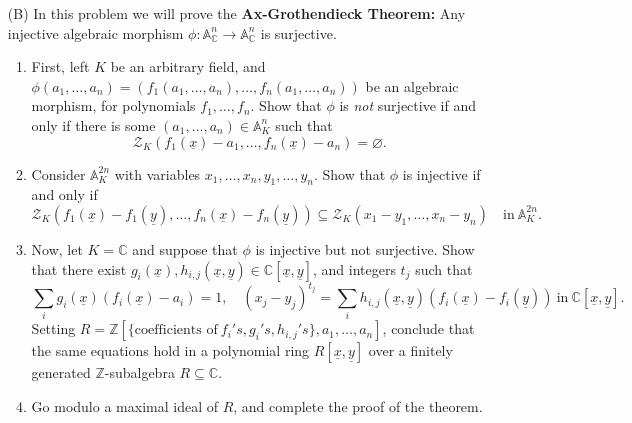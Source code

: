 \documentclass{amsart}[12pt]
\newcommand{\A}{\mathbb{A}}
\newcommand{\C}{\mathbb{C}}
\numberwithin{equation}{section}
\theoremstyle{plain} %
\theoremstyle{definition}
\theoremstyle{remark}
\begin{document}
\begin{enumerate}
\item[(B)] In this problem we will prove the \textbf{Ax-Grothendieck Theorem:} Any injective algebraic morphism $\phi: \A^n_{\C} \to \A^n_{\C}$ is surjective.
\begin{enumerate} \item First, left $K$ be an arbitrary field, and $\phi(a_1,\dots,a_n) = (f_1(a_1,\dots,a_n),\dots, f_n(a_1,\dots,a_n))$ be an algebraic morphism, for polynomials $f_1,\dots,f_n$. Show that $\phi$ is \emph{not} surjective if and only if there is some $(a_1,\dots,a_n)\in \A^n_K$ such that
\[ \mathcal{Z}_K( f_1(\underline{x}) - a_1, \dots, f_n(\underline{x})-a_n ) = \varnothing.\]
\item Consider $\A^{2n}_{K}$ with variables $x_1,\dots,x_n,y_1,\dots,y_n$. Show that $\phi$ is injective if and only if
\[ \mathcal{Z}_K( f_1(\underline{x}) - f_1(\underline{y}), \dots, f_n(\underline{x})-f_n(\underline{y}) ) \subseteq \mathcal{Z}_K( x_1- y_1,\dots,x_n-y_n) \quad \text{in} \ \A^{2n}_K.\]
\item Now, let $K=\mathbb{C}$ and suppose that $\phi$ is injective but not surjective. Show that there exist $g_i(\underline{x}) , h_{i,j}(\underline{x},\underline{y})\in \mathbb{C}[\underline{x},\underline{y}]$, and integers $t_j$ such that
\[ \sum_i g_i(\underline{x}) (f_i(\underline{x}) - a_i) =1, \quad (x_j-y_j)^{t_j} = \sum_i h_{i,j}(\underline{x},\underline{y}) (f_i(\underline{x}) - f_i(\underline{y})) \ \text{in} \ \mathbb{C}[\underline{x},\underline{y}].\]
Setting $R=\mathbb{Z}[ \{\text{coefficients of} \ f_i's, g_i's, h_{i,j}'s\}, a_1,\dots,a_n]$, conclude that the same equations hold in a polynomial ring $R[\underline{x},\underline{y}]$ over a finitely generated $\mathbb{Z}$-subalgebra $R\subseteq \mathbb{C}$.
\item Go modulo a maximal ideal of $R$, and complete the proof of the theorem.
\end{enumerate}
\end{enumerate}
\end{document}
